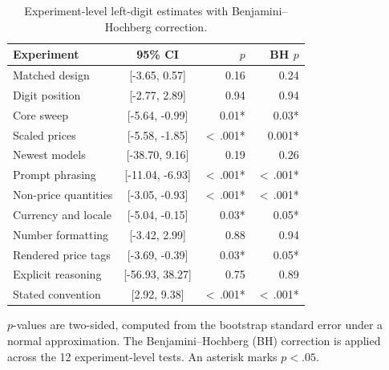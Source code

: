 \begin{table}[t]
\centering
\caption{Experiment-level left-digit estimates with Benjamini--Hochberg correction.}
\label{tab:mult}
\small
\begin{tabular}{lcrr}
\toprule
Experiment & 95\% CI & $p$ & BH $p$ \\
\midrule
Matched design & [-3.65, 0.57] & 0.16 & 0.24 \\
Digit position & [-2.77, 2.89] & 0.94 & 0.94 \\
Core sweep & [-5.64, -0.99] & 0.01* & 0.03* \\
Scaled prices & [-5.58, -1.85] & $<$\,.001* & 0.001* \\
Newest models & [-38.70, 9.16] & 0.19 & 0.26 \\
Prompt phrasing & [-11.04, -6.93] & $<$\,.001* & $<$\,.001* \\
Non-price quantities & [-3.05, -0.93] & $<$\,.001* & $<$\,.001* \\
Currency and locale & [-5.04, -0.15] & 0.03* & 0.05* \\
Number formatting & [-3.42, 2.99] & 0.88 & 0.94 \\
Rendered price tags & [-3.69, -0.39] & 0.03* & 0.05* \\
Explicit reasoning & [-56.93, 38.27] & 0.75 & 0.89 \\
Stated convention & [2.92, 9.38] & $<$\,.001* & $<$\,.001* \\
\bottomrule
\end{tabular}
\vspace{2pt}
\parbox{\linewidth}{\footnotesize $p$-values are two-sided, computed from the bootstrap standard error under a normal approximation. The Benjamini--Hochberg (BH) correction is applied across the 12 experiment-level tests. An asterisk marks $p < .05$.}
\end{table}
